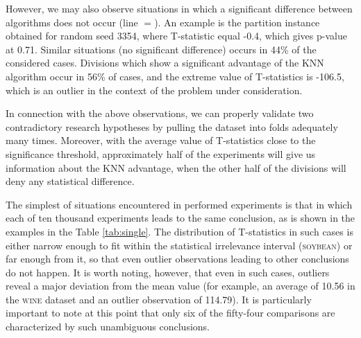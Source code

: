 \documentclass[12pt,a4paper]{report}
\begin{document}
However, we may also observe situations in which a significant difference between algorithms does not occur (line $=$). An example is the partition instance obtained for random seed 3354, where T-statistic equal -0.4, which gives p-value at 0.71. Similar situations (no significant difference) occurs in 44\% of the considered cases. Divisions which show a significant advantage of the KNN algorithm occur in 56\% of cases, and the extreme value of T-statistics is -106.5, which is an outlier in the context of the problem under consideration.


In connection with the above observations, we can properly validate two contradictory research hypotheses by pulling the dataset into folds adequately many times. Moreover, with the average value of T-statistics close to the significance threshold, approximately half of the experiments will give us information about the KNN advantage, when the other half of the divisions will deny any statistical difference.


The simplest of situations encountered in performed experiments is that in which each of ten thousand experiments leads to the same conclusion, as is shown in the examples in the Table \ref{tab:single}. The distribution of T-statistics in such cases is either narrow enough to fit within the statistical irrelevance interval (\textsc{soybean}) or far enough from it, so that even outlier observations leading to other conclusions do not happen. It is worth noting, however, that even in such cases, outliers reveal a major deviation from the mean value (for example, an average of 10.56 in the \textsc{wine} dataset and an outlier observation of 114.79). It is particularly important to note at this point that only six of the fifty-four comparisons are characterized by such unambiguous conclusions.
\end{document}
